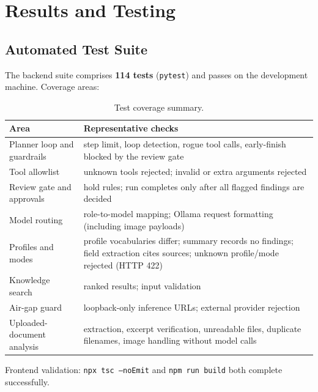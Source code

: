 \documentclass[11pt,a4paper]{article}
\begin{document}
\section{Results and Testing}

\subsection{Automated Test Suite}
The backend suite comprises \textbf{114 tests} (\texttt{pytest}) and passes on
the development machine. Coverage areas:

\begin{table}[htbp]
\centering
\small
\begin{tabular}{@{}p{6.0cm} p{8.2cm}@{}}
\toprule
\textbf{Area} & \textbf{Representative checks} \\
\midrule
Planner loop and guardrails & step limit, loop detection, rogue tool calls, early-finish blocked by the review gate \\
Tool allowlist & unknown tools rejected; invalid or extra arguments rejected \\
Review gate and approvals & hold rules; run completes only after all flagged findings are decided \\
Model routing & role-to-model mapping; Ollama request formatting (including image payloads) \\
Profiles and modes & profile vocabularies differ; summary records no findings; field extraction cites sources; unknown profile/mode rejected (HTTP 422) \\
Knowledge search & ranked results; input validation \\
Air-gap guard & loopback-only inference URLs; external provider rejection \\
Uploaded-document analysis & extraction, excerpt verification, unreadable files, duplicate filenames, image handling without model calls \\
\bottomrule
\end{tabular}
\caption{Test coverage summary.}
\end{table}

\noindent Frontend validation: \texttt{npx tsc --noEmit} and
\texttt{npm run build} both complete successfully.
\end{document}

